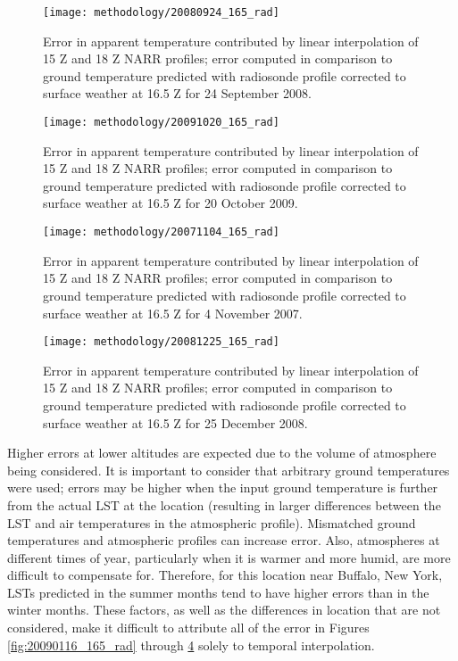 \documentclass{book}
\begin{document}
\begin{figure}[H]
\centering
\texttt{[image: methodology/20080924\_165\_rad]}
\caption{Error in apparent temperature contributed by linear interpolation of 15 Z and 18 Z NARR profiles; error computed in comparison to ground temperature predicted with radiosonde profile corrected to surface weather at 16.5 Z for 24 September 2008.}
\label{fig:20090802_165_rad}
\end{figure}

\begin{figure}[H]
\centering
\texttt{[image: methodology/20091020\_165\_rad]}
\caption{Error in apparent temperature contributed by linear interpolation of 15 Z and 18 Z NARR profiles; error computed in comparison to ground temperature predicted with radiosonde profile corrected to surface weather at 16.5 Z for 20 October 2009.}
\label{fig:20091020_165_rad}
\end{figure}

\begin{figure}[H]
\centering
\texttt{[image: methodology/20071104\_165\_rad]}
\caption{Error in apparent temperature contributed by linear interpolation of 15 Z and 18 Z NARR profiles; error computed in comparison to ground temperature predicted with radiosonde profile corrected to surface weather at 16.5 Z for 4 November 2007.}
\label{fig:20071104_165_rad}
\end{figure}

\begin{figure}[H]
\centering
\texttt{[image: methodology/20081225\_165\_rad]}
\caption{Error in apparent temperature contributed by linear interpolation of 15 Z and 18 Z NARR profiles; error computed in comparison to ground temperature predicted with radiosonde profile corrected to surface weather at 16.5 Z for 25 December 2008.}
\label{fig:20081225_165_rad}
\end{figure}

Higher errors at lower altitudes are expected due to the volume of atmosphere being considered.  It is important to consider that arbitrary ground temperatures were used; errors may be higher when the input ground temperature is further from the actual LST at the location (resulting in larger differences between the LST and air temperatures in the atmospheric profile).  Mismatched ground temperatures and atmospheric profiles can increase error.  Also, atmospheres at different times of year, particularly when it is warmer and more humid, are more difficult to compensate for.  Therefore, for this location near Buffalo, New York, LSTs predicted in the summer months tend to have higher errors than in the winter months.  These factors, as well as the differences in location that are not considered, make it difficult to attribute all of the error in Figures \ref{fig:20090116_165_rad} through \ref{fig:20081225_165_rad} solely to temporal interpolation.
\end{document}
